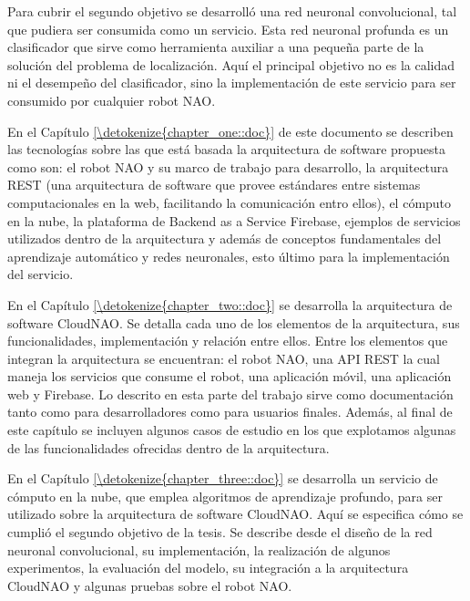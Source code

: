 Para cubrir el segundo objetivo se desarrolló 
una red neuronal convolucional, tal que pudiera ser consumida
como un servicio. Esta red neuronal profunda es un clasificador
que sirve como herramienta auxiliar a una pequeña parte de la solución 
del problema de localización. Aquí el principal objetivo
no es la calidad ni el desempeño del clasificador,
sino la implementación de este servicio para ser consumido
por cualquier robot NAO.

En el Capítulo \ref{\detokenize{chapter_one::doc}} de este 
documento se describen las tecnologías sobre las que está
basada la arquitectura de software propuesta como son: el 
robot NAO y su marco de trabajo para desarrollo, la 
arquitectura REST (una arquitectura de software que provee 
estándares entre sistemas computacionales en la web, 
facilitando la comunicación entro ellos), 
el cómputo en la nube, la plataforma de Backend as a Service 
Firebase, ejemplos de servicios utilizados dentro de la 
arquitectura y además de conceptos fundamentales del 
aprendizaje automático y redes neuronales, esto último para la
implementación del servicio.

En el Capítulo \ref{\detokenize{chapter_two::doc}} se 
desarrolla la arquitectura de software
CloudNAO. Se detalla cada uno de los elementos de la arquitectura, sus funcionalidades, implementación y relación
entre ellos.
Entre los elementos que integran la arquitectura se 
encuentran: el robot NAO, una API REST la cual maneja los 
servicios que consume el robot, una aplicación móvil, una 
aplicación web y Firebase.
Lo descrito
en esta parte del trabajo sirve 
como documentación tanto como para desarrolladores como
para usuarios finales. Además, al final de este capítulo
se incluyen algunos casos de estudio en los que
explotamos algunas de las funcionalidades 
ofrecidas dentro de la arquitectura.


En el Capítulo \ref{\detokenize{chapter_three::doc}} se 
desarrolla un servicio de cómputo en la nube,
que emplea algoritmos de aprendizaje profundo, para ser 
utilizado sobre la arquitectura de software CloudNAO.
Aquí se especifica cómo se cumplió el segundo
objetivo de la tesis. Se describe desde el diseño de
la red neuronal convolucional, su implementación, 
la realización de algunos experimentos, la evaluación
del modelo, su integración a la arquitectura CloudNAO
y algunas pruebas sobre el robot NAO.
